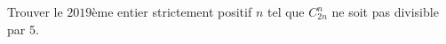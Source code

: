 \documentclass[varwidth]{standalone}
\begin{document}
    Trouver le $2019$\`eme entier strictement positif $n$ tel que $C_{2n}^{n}$ ne soit pas divisible par $5$.
\end{document}
